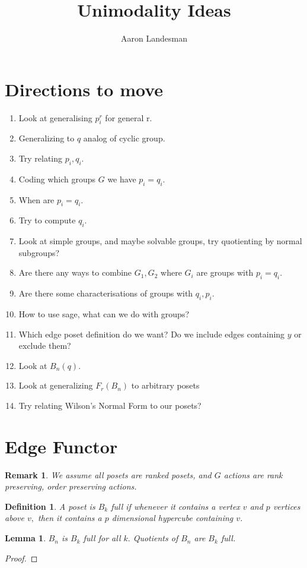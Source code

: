 \documentclass{amsart}
\title{Unimodality Ideas}
\author{Aaron Landesman}
\newtheorem{lem}[subsubsection]{Lemma}
\newtheorem{defn}[subsubsection]{Definition}
\newtheorem{rem}[subsubsection]{Remark}
\begin{document}
\maketitle
\section{Directions to move}
\begin{enumerate}
	\item Look at generalising $p_i^r$ for general r.
	\item Generalizing to $q$ analog of cyclic group.
	\item Try relating $p_i,q_i.$
	\item Coding which groups $G$ we have $p_i=q_i.$
	\item When are $p_i = q_i.$
	\item Try to compute $q_i.$
	\item Look at simple groups, and maybe solvable groups, try quotienting by normal subgroups?
	\item Are there any ways to combine $G_1,G_2$ where $G_i$ are groups with $p_i = q_i.$
	\item Are there some characterisations of groups with $q_i,p_i.$
	\item How to use sage, what can we do with groups?
	\item Which edge poset definition do we want? Do we include edges containing $y$ or exclude them?
	\item Look at $B_n(q).$ 
	\item Look at generalizing $F_r(B_n)$ to arbitrary posets
	\item Try relating Wilson's Normal Form to our posets?
\end{enumerate}

\section{Edge Functor}
\begin{rem}
We assume all posets are ranked posets, and $G$ actions are rank preserving, order preserving actions.
\end{rem}

\begin{defn}
A poset is $B_k$ full if whenever it contains a vertex $v$ and $p$ vertices above $v,$ then it contains a $p$ dimensional hypercube containing $v$.
\end{defn}

\begin{lem}
$B_n$ is $B_k$ full for all $k.$ Quotients of $B_n$ are $B_k$ full.
\end{lem}
\begin{proof}

\end{proof}
\end{document}

